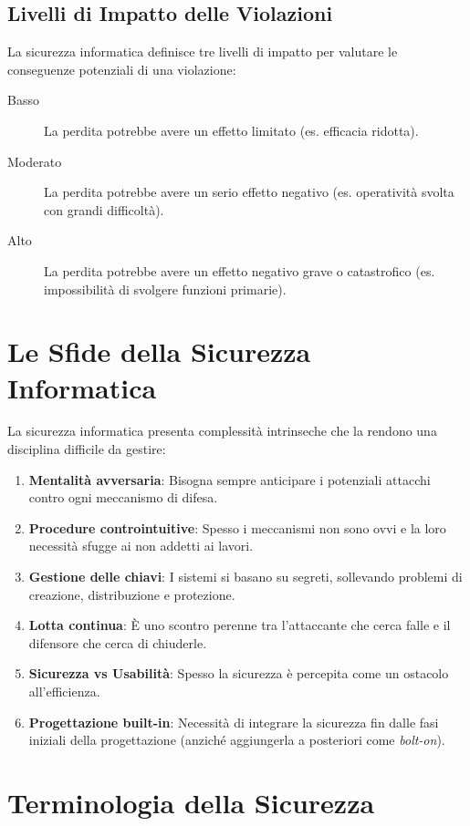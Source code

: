 \subsection{Livelli di Impatto delle Violazioni}

La sicurezza informatica definisce tre livelli di impatto per valutare le conseguenze potenziali di una violazione:

\begin{description}
    \item[Basso] La perdita potrebbe avere un effetto limitato (es. efficacia ridotta).
    \item[Moderato] La perdita potrebbe avere un serio effetto negativo (es. operatività svolta con grandi difficoltà).
    \item[Alto] La perdita potrebbe avere un effetto negativo grave o catastrofico (es. impossibilità di svolgere funzioni primarie).
\end{description}

\section{Le Sfide della Sicurezza Informatica}
La sicurezza informatica presenta complessità intrinseche che la rendono una disciplina difficile da gestire:
\begin{enumerate}
    \item \textbf{Mentalità avversaria}: Bisogna sempre anticipare i potenziali attacchi contro ogni meccanismo di difesa.
    \item \textbf{Procedure controintuitive}: Spesso i meccanismi non sono ovvi e la loro necessità sfugge ai non addetti ai lavori.
    \item \textbf{Gestione delle chiavi}: I sistemi si basano su segreti, sollevando problemi di creazione, distribuzione e protezione.
    \item \textbf{Lotta continua}: È uno scontro perenne tra l'attaccante che cerca falle e il difensore che cerca di chiuderle.
    \item \textbf{Sicurezza vs Usabilità}: Spesso la sicurezza è percepita come un ostacolo all'efficienza.
    \item \textbf{Progettazione built-in}: Necessità di integrare la sicurezza fin dalle fasi iniziali della progettazione (anziché aggiungerla a posteriori come \textit{bolt-on}).
\end{enumerate}

\section{Terminologia della Sicurezza}

